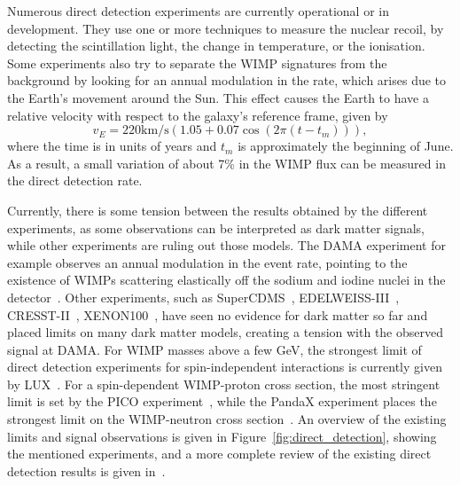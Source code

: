 Numerous direct detection experiments are currently operational or in development. They use one or more techniques to measure the nuclear recoil, by detecting the scintillation light, the change in temperature, or the ionisation. Some experiments also try to separate the \ac{WIMP} signatures from the background by looking for an annual modulation in the rate, which arises due to the Earth's movement around the Sun. This effect causes the Earth to have a relative velocity with respect to the galaxy's reference frame, given by 
\begin{equation}
v_E = 220\mathrm{km/s}\left(1.05+0.07\cos(2\pi(t-t_m))\right),
\end{equation}
where the time is in units of years and $t_m$ is approximately the beginning of June. As a result, a small variation of about 7\% in the \ac{WIMP} flux can be measured in the direct detection rate. 

Currently, there is some tension between the results obtained by the different experiments, as some observations can be interpreted as dark matter signals, while other experiments are ruling out those models. The DAMA experiment for example observes an annual modulation in the event rate, pointing to the existence of \acp{WIMP} scattering elastically off the sodium and iodine nuclei in the detector~\cite{Bernabei:2013xsa}. 
Other experiments, such as SuperCDMS~\cite{Agnese:2014aze}, EDELWEISS-III~\cite{Armengaud:2016cvl}, CRESST-II~\cite{Angloher:2014myn}, XENON100~\cite{Aprile:2016swn}, have seen no evidence for dark matter so far and placed limits on many dark matter models, creating a tension with the observed signal at DAMA. For \ac{WIMP} masses above a few GeV, the strongest limit of direct detection experiments for spin-independent interactions is currently given by LUX~\cite{Akerib:2016vxi}. For a spin-dependent \ac{WIMP}-proton cross section, the most stringent limit is set by the PICO experiment~\cite{Amole:2017dex}, while the PandaX experiment places the strongest limit on the \ac{WIMP}-neutron cross section~\cite{Fu:2016ega}. An overview of the existing limits and signal observations is given in Figure~\ref{fig:direct_detection}, showing the mentioned experiments, and a more complete review of the existing direct detection results is given in~\cite{Undagoitia:2015gya}.

